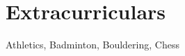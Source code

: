\section{Extracurriculars}
\begin{itemize}[leftmargin=0.15in, label={}]
\small{\item{
    {Athletics, Badminton, Bouldering, Chess}
}}
\end{itemize}